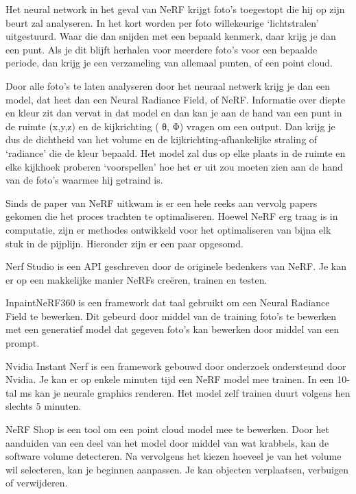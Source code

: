 Het neural network in het geval van NeRF krijgt foto’s toegestopt die hij op zijn beurt zal analyseren. In het kort worden per foto willekeurige ‘lichtstralen’ uitgestuurd. Waar die dan snijden met een bepaald kenmerk, daar krijg je dan een punt. Als je dit blijft herhalen voor meerdere foto’s voor een bepaalde periode, dan krijg je een verzameling van allemaal punten, of een point cloud. 

Door alle foto’s te laten analyseren door het neuraal netwerk krijg je dan een model, dat heet dan een Neural Radiance Field, of NeRF. Informatie over diepte en kleur zit dan vervat in dat model en dan kan je aan de hand van een punt in de ruimte (x,y,z) en de kijkrichting ( θ, Φ) vragen om een output. Dan krijg je dus de dichtheid van het volume en de kijkrichting-afhankelijke straling of ‘radiance’ die de kleur bepaald. Het model zal dus  op elke plaats in de ruimte en elke kijkhoek proberen ‘voorspellen’ hoe het er uit zou moeten zien aan de hand van de foto’s waarmee hij getraind is. \autocite{Mildenhall2020}

Sinds de paper van NeRF uitkwam is er een hele reeks aan vervolg papers gekomen die het proces trachten te optimaliseren. Hoewel NeRF erg traag is in computatie, zijn er methodes ontwikkeld voor het optimaliseren van bijna elk stuk in de pijplijn. Hieronder zijn er een paar opgesomd.

Nerf Studio is een API  geschreven door de originele bedenkers van NeRF. Je kan er op een makkelijke manier NeRFs creëren, trainen en testen. \autocite{Tancik2023a}

InpaintNeRF360 is een framework dat taal gebruikt om een Neural Radiance Field te bewerken. Dit gebeurd door middel van de training foto’s te bewerken met een generatief model dat gegeven foto’s kan bewerken door middel van een prompt. \autocite{Wang2023a}


Nvidia Instant Nerf is een framework gebouwd door onderzoek ondersteund door Nvidia. Je kan er op enkele minuten tijd een NeRF model mee trainen. In een 10-tal ms kan je neurale graphics renderen. Het model zelf trainen duurt volgens hen slechts 5 minuten. 
\autocite{Mueller2022}

NeRF Shop is een tool om een point cloud model mee te bewerken. Door het aanduiden van een deel van het model door middel van wat krabbels, kan de software volume detecteren. Na vervolgens het kiezen hoeveel je van het volume wil selecteren, kan je beginnen aanpassen. 
Je kan objecten verplaatsen, verbuigen of verwijderen.\autocite{NeRFshop23}

